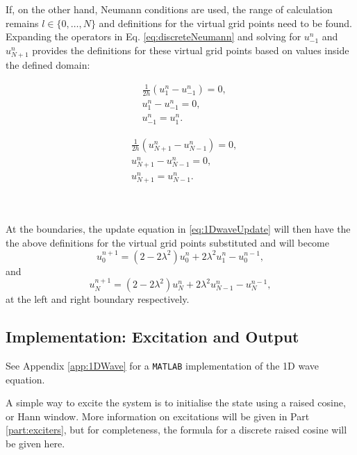 If, on the other hand, Neumann conditions are used, the range of calculation remains $l\in\{0,\hdots, N\}$ and definitions for the virtual grid points need to be found.
Expanding the operators in Eq. \eqref{eq:discreteNeumann} and solving for $u_{-1}^n$ and $u_{N+1}^n$ provides the definitions for these virtual grid points based on values inside the defined domain:

\begin{minipage}[c]{0.49\textwidth}
    \begin{align*}
        &\frac{1}{2h} \left(u_1^n - u_{-1}^n\right) = 0,\\
        &u_1^n - u_{-1}^n = 0,\\
        &u_{-1}^n = u_1^n.
    \end{align*}
\end{minipage}
\begin{minipage}[c]{0.49\textwidth}
    \begin{align*}
        &\frac{1}{2h} \left(u_{N+1}^n - u_{N-1}^n\right) = 0,\\
        &u_{N+1}^n - u_{N-1}^n = 0,\\
        &u_{N+1}^n = u_{N-1}^n.
    \end{align*}
\end{minipage}
\\
\\
\noindent At the boundaries, the update equation in \eqref{eq:1DwaveUpdate} will then have the the above definitions for the virtual grid points substituted and will become 
\begin{equation}\label{eq:1DWaveLeftBound}
    u_0^{n+1} = \left(2-2\lambda^2\right) u_0^n  + 2\lambda^2 u_1^n - u_0^{n-1},
\end{equation}
and 
\begin{equation}\label{eq:1DWaveRightBound}
    u_N^{n+1} = \left(2-2\lambda^2\right) u_N^n  + 2\lambda^2 u_{N-1}^n - u_N^{n-1},
\end{equation}
at the left and right boundary respectively.

\subsection{Implementation: Excitation and Output}\label{sec:output1DWave}
See Appendix \ref{app:1DWave} for a \texttt{MATLAB} implementation of the 1D wave equation.

A simple way to excite the system is to initialise the state using a raised cosine, or Hann window. More information on excitations will be given in Part \ref{part:exciters}, but for completeness, the formula for a discrete raised cosine will be given here. 

